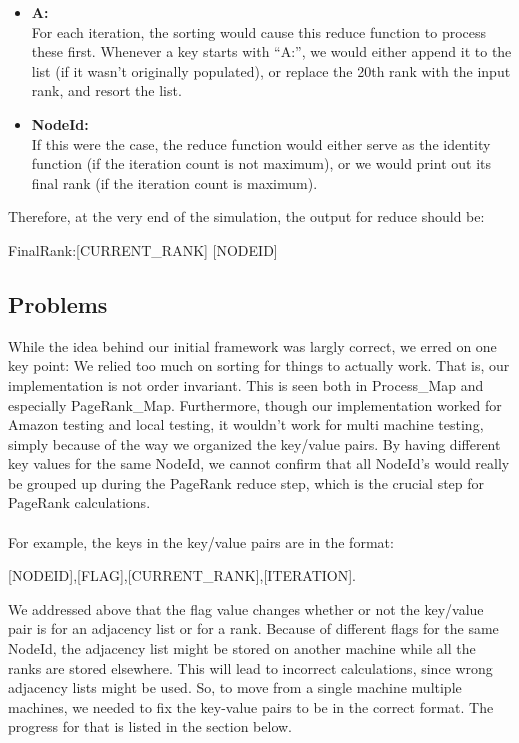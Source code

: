 \documentclass{article}
\begin{document}
\begin{itemize}
        \begin{itemize}
          \item \textbf{A:}\\
            For each iteration, the sorting would cause this reduce function to process these first. Whenever a key starts with ``A:'', we would either append it to the list (if it wasn't originally populated), or replace the 20th rank with the input rank, and resort the list.
          \item \textbf{NodeId:} \\
            If this were the case, the reduce function would either serve as the identity function (if the iteration count is not maximum), or we would print out its final rank (if the iteration count is maximum). 
        \end{itemize}

        Therefore, at the very end of the simulation, the output for reduce should be:
        \begin{center}
        FinalRank:[CURRENT\_RANK] \hspace{4mm} [NODEID]
        \end{center}
    \end{itemize}

\subsection*{Problems}
  While the idea behind our initial framework was largly correct, we erred on one key point: We relied too much on sorting for things to actually work. That is, our implementation is not order invariant. This is seen both in Process\_Map and especially PageRank\_Map. Furthermore, though our implementation worked for Amazon testing and local testing, it wouldn't work for multi machine testing, simply because of the way we organized the key/value pairs. By having different key values for the same NodeId, we cannot confirm that all NodeId's would really be grouped up during the PageRank reduce step, which is the crucial step for PageRank calculations.
  \\ \\
  For example, the keys in the key/value pairs are in the format:
  \begin{center}
    [NODEID],[FLAG],[CURRENT\_RANK],[ITERATION].
  \end{center}
  We addressed above that the flag value changes whether or not the key/value pair is for an adjacency list or for a rank. Because of different flags for the same NodeId, the adjacency list might be stored on another machine while all the ranks are stored elsewhere. This will lead to incorrect calculations, since wrong adjacency lists might be used. So, to move from a single machine multiple machines, we needed to fix the key-value pairs to be in the correct format. The progress for that is listed in the section below.
\end{document}
